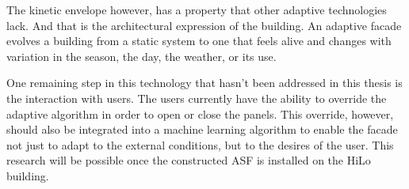 The kinetic envelope however, has a property that other adaptive technologies lack. And that is the architectural expression of the building. An adaptive facade evolves a building from a static system to one that feels alive and changes with variation in the season, the day, the weather, or its use. 

One remaining step in this technology that hasn't been addressed in this thesis is the interaction with users. The users currently have the ability to override the adaptive algorithm in order to open or close the panels. This override, however, should also be integrated into a machine learning algorithm to enable the facade not just to adapt to the external conditions, but to the desires of the user. This research will be possible once the constructed ASF is installed on the HiLo building.


